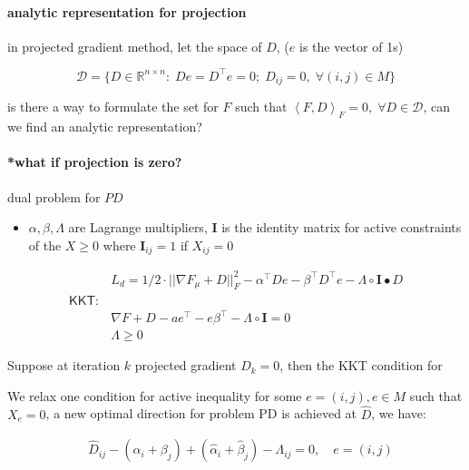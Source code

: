 \documentclass[
  10pt,
  a4paper,
,tablecaptionabove
]{scrartcl}
\providecommand{\tightlist}{%
  \setlength{\itemsep}{0pt}\setlength{\parskip}{0pt}}
\begin{document}
\hypertarget{analytic-representation-for-projection}{%
\paragraph{analytic representation for
projection}\label{analytic-representation-for-projection}}

in projected gradient method, let the space of \(D\), (\(e\) is the
vector of 1s)

\[\mathcal D = \{D\in\mathbb{R}^{n\times n} : \; D e = D^\top e = 0;\; D_{ij} = 0,\;\forall  (i,j) \in M \}\]

is there a way to formulate the set for \(F\) such that
\(\left <F, D \right>_F = 0, \; \forall D\in \mathcal D\), can we find
an analytic representation?

\hypertarget{what-if-projection-is-zero}{%
\paragraph{*what if projection is
zero?}\label{what-if-projection-is-zero}}

dual problem for \(PD\)

\begin{itemize}
\tightlist
\item
  \(\alpha,\beta,\Lambda\) are Lagrange multipliers, \(\mathbf I\) is
  the identity matrix for active constraints of the \(X \ge 0\) where
  \(\mathbf I_{ij} = 1\) if \(X_{ij} = 0\)
\end{itemize}

\[\begin{aligned}
& L_d = 1/2\cdot ||\nabla F_\mu + D ||_F^2 - \alpha^\top De - \beta^\top D^\top e -\Lambda \circ \mathbf I \bullet D\\
\mathsf{KKT:} & \\
& \nabla F+D - ae^\top - e\beta^\top -\Lambda \circ \mathbf{I} = 0 \\
& \Lambda \ge 0
\end{aligned}\]

Suppose at iteration \(k\) projected gradient \(D_k = 0\), then the KKT
condition for

We relax one condition for active inequality for some
\(e = (i,j), e \in M\) such that \(X_e =0\), a new optimal direction for
problem PD is achieved at \(\hat D\), we have:

\[\begin{aligned}
 & \hat D_{ij} - (\alpha_i + \beta_j) + (\hat \alpha_i + \hat \beta_j) - \Lambda_{ij} = 0, \quad e = (i,j) \\
\end{aligned}\]
\end{document}
